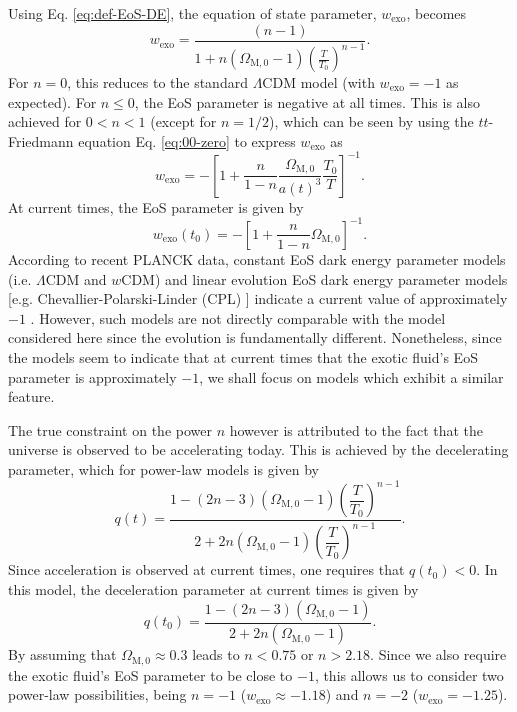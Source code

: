 \documentclass[prl,floatfix,showpacs,twocolumn,preprintnumbers,amsmath,amssymb,superscriptaddress]{revtex4}
\begin{document}
Using Eq. \eqref{eq:def-EoS-DE}, the equation of state parameter, $w_{\text{exo}}$, becomes
\begin{equation}
w_{\text{exo}} = \dfrac{(n-1)}{1+n (\Omega_{\text{M},0}-1) \left(\frac{T}{T_0}\right)^{n-1}}.
\end{equation}
For $n = 0$, this reduces to the standard $\Lambda$CDM model (with $w_{\text{exo}} = -1$ as expected). For $n \leq 0$, the EoS parameter is negative at all times. This is also achieved for $0 < n < 1$ (except for $n = 1/2$), which can be seen by using the $tt$-Friedmann equation Eq. \eqref{eq:00-zero} to express $w_{\text{exo}}$ as
\begin{equation}
w_{\text{exo}} = -\left[1+\dfrac{n}{1-n}\dfrac{\Omega_{\text{M},0}}{a(t)^3}\dfrac{T_0}{T}\right]^{-1}.
\end{equation}
At current times, the EoS parameter is given by
\begin{equation}
w_{\text{exo}}(t_0) = -\left[1+\dfrac{n}{1-n}\Omega_{\text{M},0}\right]^{-1}.
\end{equation}
According to recent PLANCK data, constant EoS dark energy parameter models (i.e. $\Lambda$CDM and $w$CDM) and linear evolution EoS dark energy parameter models [e.g. Chevallier-Polarski-Linder (CPL) \cite{Chevallier:2000qy,Linder:2002et}] indicate a current value of approximately $-1$ \cite{Kumar:2012gr,Capozziello:2013wha,Aubourg:2014yra,Ade:2013zuv,Magana:2014voa}. However, such models are not directly comparable with the model considered here since the evolution is fundamentally different. Nonetheless, since the models seem to indicate that at current times that the exotic fluid's EoS parameter is approximately $-1$, we shall focus on models which exhibit a similar feature. 

The true constraint on the power $n$ however is attributed to the fact that the universe is observed to be accelerating today. This is achieved by the decelerating parameter, which for power-law models is given by
\begin{equation}
q(t) = \frac{1-(2 n-3) (\Omega_{\text{M},0}-1) \left(\dfrac{T}{T_0}\right)^{n-1}}{2+2 n (\Omega_{\text{M},0}-1)  \left(\dfrac{T}{T_0}\right)^{n-1}}.
\end{equation}
Since acceleration is observed at current times, one requires that $q\left(t_0\right) < 0$. In this model, the deceleration parameter at current times is given by
\begin{equation}
q\left(t_0\right) = \frac{1-(2 n-3) (\Omega_{\text{M},0}-1)}{2+2 n (\Omega_{\text{M},0}-1)}.
\end{equation} 
By assuming that $\Omega_{\text{M},0} \approx 0.3$ leads to $n<0.75$ or $n>2.18$. Since we also require the exotic fluid's EoS parameter to be close to $-1$, this allows us to consider two power-law possibilities, being $n = -1$ ($w_{\text{exo}} \approx -1.18$) and $n = -2$ ($w_{\text{exo}} = -1.25$). 
\end{document}
